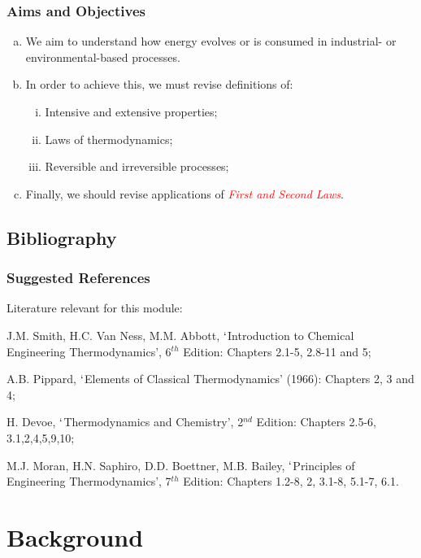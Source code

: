 \documentclass[10pt,compress]{beamer}
\newcommand{\red}{\textcolor{red}}
\begin{document}
\begin{frame}
 \frametitle{Aims and Objectives}

     \begin{enumerate}[(a)]
      \item <1-> We aim to understand how energy evolves or is consumed in industrial- or environmental-based processes.
      \item <2-> In order to achieve this, we must revise definitions of:
       \begin{enumerate}[(i)]
        \item <2-> Intensive and extensive properties;
        \item <2-> Laws of thermodynamics;
        \item <2-> Reversible and irreversible processes;
       \end{enumerate}
      \item <3->Finally, we should revise applications of \red{{\it First and Second Laws}}. 
     \end{enumerate}
\end{frame}


\subsection{Bibliography} 

\begin{frame}
 \frametitle{Suggested References}
  Literature relevant for this module:
  \begin{enumerate}[{[}1{]}]
   \item J.M. Smith, H.C. Van Ness, M.M. Abbott, $\lq$Introduction to Chemical Engineering Thermodynamics', 6$^{th}$ Edition: Chapters 2.1-5, 2.8-11 and 5;
   \item A.B. Pippard, $\lq$Elements of Classical Thermodynamics' (1966): Chapters 2, 3 and 4;
   \item H. Devoe, $\lq$Thermodynamics and Chemistry', 2$^{nd}$ Edition: Chapters 2.5-6, 3.1,2,4,5,9,10;
   \item M.J. Moran, H.N. Saphiro, D.D. Boettner, M.B. Bailey, $\lq$Principles of Engineering Thermodynamics', 7$^{th}$ Edition: Chapters 1.2-8, 2, 3.1-8, 5.1-7, 6.1.
  \end{enumerate}
\end{frame}
 
\section{Background} 
\end{document}
